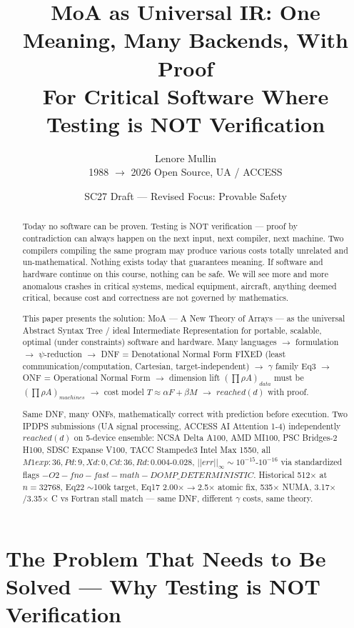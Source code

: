 \documentclass[11pt]{article}
\title{MoA as Universal IR: One Meaning, Many Backends, With Proof \\ For Critical Software Where Testing is NOT Verification}
\author{Lenore Mullin \\ 1988 $\rightarrow$ 2026 Open Source, UA / ACCESS}
\date{SC27 Draft — Revised Focus: Provable Safety}
\begin{document}
\maketitle

\begin{abstract}
Today no software can be proven. Testing is NOT verification — proof by contradiction can always happen on the next input, next compiler, next machine. Two compilers compiling the same program may produce various costs totally unrelated and un-mathematical. Nothing exists today that guarantees meaning. If software and hardware continue on this course, nothing can be safe. We will see more and more anomalous crashes in critical systems, medical equipment, aircraft, anything deemed critical, because cost and correctness are not governed by mathematics.

This paper presents the solution: MoA — A New Theory of Arrays — as the universal Abstract Syntax Tree / ideal Intermediate Representation for portable, scalable, optimal (under constraints) software and hardware. Many languages $\rightarrow$ formulation $\rightarrow$ $\psi$-reduction $\rightarrow$ DNF = Denotational Normal Form FIXED (least communication/computation, Cartesian, target-independent) $\rightarrow$ $\gamma$ family Eq3 $\rightarrow$ ONF = Operational Normal Form $\rightarrow$ dimension lift $(\prod\rho A)_{data}$ must be $(\prod\rho A)_{machines}$ $\rightarrow$ cost model $T\approx\alpha F+\beta M$ $\rightarrow$ $reached(d)$ with proof.

Same DNF, many ONFs, mathematically correct with prediction before execution. Two IPDPS submissions (UA signal processing, ACCESS AI Attention 1-4) independently $reached(d)$ on 5-device ensemble: NCSA Delta A100, AMD MI100, PSC Bridges-2 H100, SDSC Expanse V100, TACC Stampede3 Intel Max 1550, all $M1exp{:}36,Pd{:}9,Xd{:}0,Cd{:}36,Rd{:}0.004$-$0.028$, $||err||_\infty\sim10^{-15}$-$10^{-16}$ via standardized flags $-O2 -fno-fast-math -DOMP\_DETERMINISTIC$. Historical 512$\times$ at $n=32768$, Eq22 $\sim$100k target, Eq17 2.00$\times\rightarrow$2.5$\times$ atomic fix, 535$\times$ NUMA, 3.17$\times$/3.35$\times$ C vs Fortran stall match — same DNF, different $\gamma$ costs, same theory.
\end{abstract}

\section{The Problem That Needs to Be Solved — Why Testing is NOT Verification}
\end{document}
